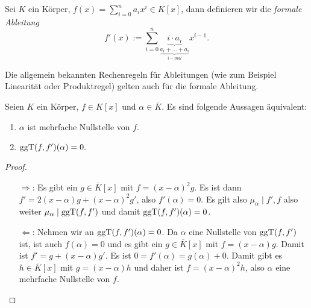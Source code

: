 \begin{definition}
    Sei $K$ ein Körper, $f(x) = \sum_{i=0}^n a_i x^i \in K[x]$, dann definieren wir die \emph{formale Ableitung}
    $$ f'(x) := \sum_{i=0}^n \underbrace{i\cdot a_i}_{\underbrace{a_i + \ldots + a_i}_{i-mal}} x^{i-1}. $$
\end{definition}
\begin{remark}
    Die allgemein bekannten Rechenregeln für Ableitungen (wie zum Beispiel Linearität oder Produktregel) gelten auch für die formale Ableitung.
\end{remark}

\begin{lemma}\label{lemma:mehrfache_nullstellen}
    Seien $K$ ein Körper, $f \in K[x]$ und $\alpha \in \overline{K}$. Es sind folgende Aussagen äquivalent:
    \begin{enumerate}
        \item $\alpha$ ist mehrfache Nullstelle von $f$.
        \item $\operatorname{ggT}(f, f')(\alpha) = 0.$
    \end{enumerate}
\end{lemma}
\begin{proof}{\ }
    \begin{enumerate} 
        \item[$\Rightarrow$:] Es gibt ein $g \in \overline{K}[x]$ mit $f = (x-\alpha)^2 g$. Es ist dann $f' = 2(x-\alpha)g + (x-\alpha)^2g'$, also $f'(\alpha) = 0$. Es gilt also $\mu_\alpha \mid f', f$ also weiter $\mu_\alpha \mid \operatorname{ggT}(f, f')$ und damit $\operatorname{ggT}(f, f')(\alpha) = 0$. 
         
        \item[$\Leftarrow$:] Nehmen wir an $\operatorname{ggT}(f, f')(\alpha) = 0$. Da $\alpha$ eine Nullstelle von $\operatorname{ggT}(f, f')$ ist, ist auch $f(\alpha) = 0$ und es gibt ein $g \in \overline{K}[x]$ mit $f = (x-\alpha)g$. Damit ist $f' = g + (x-\alpha)g'$. Es ist $0 = f'(\alpha) = g(\alpha) + 0$. Damit gibt es $h \in \overline{K}[x]$ mit $g = (x-\alpha)h$ und daher ist $f = (x-\alpha)^2h$, also $\alpha$ eine mehrfache Nullstelle von $f$.
    \end{enumerate}
\end{proof}

